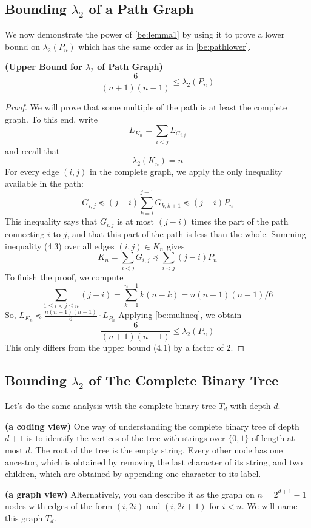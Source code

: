 \documentclass{article}
\newcommand{\bfs}[1]{\textbf{({#1}) }}
\begin{document}
\subsection{Bounding $\lambda_{2}$ of a Path Graph}\label{be:secbpg}
We now demonstrate the power of \cref{be:lemma1} by using it to prove a lower bound on $\lambda_{2}\left(P_{n}\right)$ which has the same order as in \cref{be:pathlower}.
\begin{lema}{\bfs{Upper Bound for $\lambda_2$ of Path Graph}}
$$
\frac{6}{(n+1)(n-1)} \leq \lambda_{2}\left(P_{n}\right)
$$
\end{lema}
\begin{proof}
We will prove that some multiple of the path is at least the complete graph. To this end, write
$$
L_{K_{n}}=\sum_{i<j} L_{G_{i, j}}
$$
and recall that
$$
\lambda_{2}\left(K_{n}\right)=n
$$
For every edge $(i, j)$ in the complete graph, we apply the only inequality available in the path:
$$
G_{i, j} \preccurlyeq(j-i) \sum_{k=i}^{j-1} G_{k, k+1} \preccurlyeq(j-i) P_{n}
$$
This inequality says that $G_{i, j}$ is at most $(j-i)$ times the part of the path connecting $i$ to $j$, and that this part of the path is less than the whole.
Summing inequality (4.3) over all edges $(i, j) \in K_{n}$ gives
$$
K_{n}=\sum_{i<j} G_{i, j} \preccurlyeq \sum_{i<j}(j-i) P_{n}
$$
To finish the proof, we compute
$$
\sum_{1 \leq i<j \leq n}(j-i)=\sum_{k=1}^{n-1} k(n-k)=n(n+1)(n-1) / 6
$$
So, $L_{K_{n}} \preccurlyeq \frac{n(n+1)(n-1)}{6} \cdot L_{P_{n}}$
Applying \cref{be:mulineq}, we obtain
$$
\frac{6}{(n+1)(n-1)} \leq \lambda_{2}\left(P_{n}\right)
$$
This only differs from the upper bound (4.1) by a factor of $2$.
\end{proof}

\subsection{Bounding $\lambda_2$ of The Complete Binary Tree}
Let's do the same analysis with the complete binary tree $T_d$ with depth $d$.
\begin{rema}{\bfs{a coding view}}
One way of understanding the complete binary tree of depth $d+1$ is to identify the vertices of the tree with strings over $\{0,1\}$ of length at most $d$. The root of the tree is the empty string. Every other node has one ancestor, which is obtained by removing the last character of its string, and two children, which are obtained by appending one character to its label.
\end{rema}
\begin{rema}{\bfs{a graph view}}
Alternatively, you can describe it as the graph on $n=2^{d+1}-1$ nodes with edges of the form $(i, 2 i)$ and $(i, 2 i+1)$ for $i<n$. We will name this graph $T_{d}$. 
\end{rema}
\end{document}
